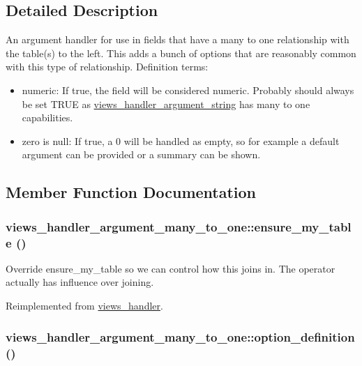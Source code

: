 \subsection{Detailed Description}
An argument handler for use in fields that have a many to one relationship with the table(s) to the left. This adds a bunch of options that are reasonably common with this type of relationship. Definition terms:\begin{itemize}
\item numeric: If true, the field will be considered numeric. Probably should always be set TRUE as \hyperlink{classviews__handler__argument__string}{views\_\-handler\_\-argument\_\-string} has many to one capabilities.\item zero is null: If true, a 0 will be handled as empty, so for example a default argument can be provided or a summary can be shown. \end{itemize}


\subsection{Member Function Documentation}
\hypertarget{classviews__handler__argument__many__to__one_f6195d516010fbd9cda241fa450a748a}{
\subsubsection[{ensure\_\-my\_\-table}]{\setlength{\rightskip}{0pt plus 5cm}views\_\-handler\_\-argument\_\-many\_\-to\_\-one::ensure\_\-my\_\-table ()}}
\label{classviews__handler__argument__many__to__one_f6195d516010fbd9cda241fa450a748a}


Override ensure\_\-my\_\-table so we can control how this joins in. The operator actually has influence over joining. 

Reimplemented from \hyperlink{classviews__handler_947f21ef0f21a77f4d103af4702b3600}{views\_\-handler}.\hypertarget{classviews__handler__argument__many__to__one_4c28692f87058983cc6a4a4d018d710e}{
\subsubsection[{option\_\-definition}]{\setlength{\rightskip}{0pt plus 5cm}views\_\-handler\_\-argument\_\-many\_\-to\_\-one::option\_\-definition ()}}
\label{classviews__handler__argument__many__to__one_4c28692f87058983cc6a4a4d018d710e}


